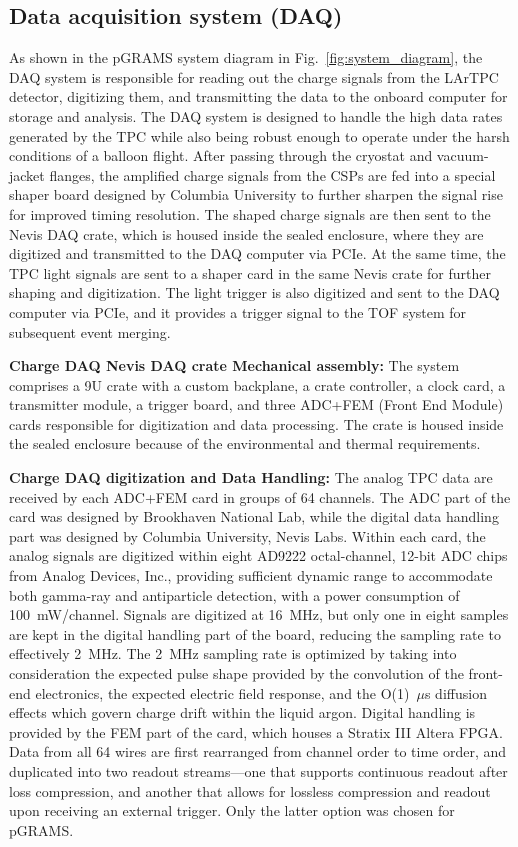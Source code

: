 \subsection{Data acquisition system (DAQ)}
\label{chap:GRAMS:pGRAMS:DAQ}
As shown in the pGRAMS system diagram in Fig.~\ref{fig:system_diagram}, the \ac{DAQ} system is responsible for reading out the charge signals from the \ac{LArTPC} detector, digitizing them, and transmitting the data to the onboard computer for storage and analysis. The \ac{DAQ} system is designed to handle the high data rates generated by the TPC while also being robust enough to operate under the harsh conditions of a balloon flight. After passing through the cryostat and vacuum-jacket flanges, the amplified charge signals from the CSPs are fed into a special shaper board designed by Columbia University to further sharpen the signal rise for improved timing resolution. The shaped charge signals are then sent to the Nevis DAQ crate, which is housed inside the sealed enclosure, where they are digitized and transmitted to the DAQ computer via PCIe. At the same time, the TPC light signals are sent to a shaper card in the same Nevis crate for further shaping and digitization. The light trigger is also digitized and sent to the DAQ computer via PCIe, and it provides a trigger signal to the \ac{TOF} system for subsequent event merging.

\noindent\textbf{Charge DAQ Nevis DAQ crate Mechanical assembly:} The system comprises a 9U crate with a custom backplane, a crate controller, a clock card, a transmitter module, a trigger board, and three ADC+FEM (Front End Module) cards responsible for digitization and data processing. The crate is housed inside the sealed enclosure because of the environmental and thermal requirements.

\noindent\textbf{Charge DAQ digitization and Data Handling:} The analog TPC data are received by each ADC+FEM card in groups of 64 channels. The ADC part of the card was designed by Brookhaven National Lab, while the digital data handling part was designed by Columbia University, Nevis Labs. Within each card, the analog signals are digitized within eight AD9222 octal-channel, 12-bit ADC chips from Analog Devices, Inc., providing sufficient dynamic range to accommodate both gamma-ray and antiparticle detection, with a power consumption of 100~mW/channel. Signals are digitized at 16~MHz, but only one in eight samples are kept in the digital handling part of the board, reducing the sampling rate to effectively 2~MHz. The 2~MHz sampling rate is optimized by taking into consideration the expected pulse shape provided by the convolution of the front-end electronics, the expected electric field response, and the O(1)~$\mu$s diffusion effects which govern charge drift within the liquid argon. Digital handling is provided by the FEM part of the card, which houses a Stratix III Altera FPGA. Data from all 64 wires are first rearranged from channel order to time order, and duplicated into two readout streams---one that supports continuous readout after loss compression, and another that allows for lossless compression and readout upon receiving an external trigger. Only the latter option was chosen for pGRAMS.

